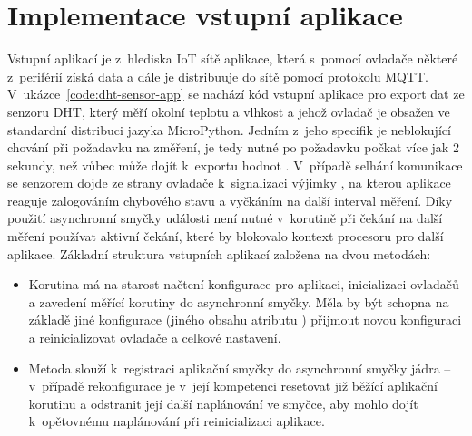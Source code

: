 \section{Implementace vstupní aplikace}\label{sec:implementace-vstupni-aplikace}
Vstupní aplikací je z~hlediska IoT sítě aplikace, která s~pomocí ovladače některé z~periférií získá data a dále je
distribuuje do sítě pomocí protokolu MQTT.
V~ukázce~\ref{code:dht-sensor-app} se nachází kód vstupní aplikace pro export dat ze senzoru DHT, který měří okolní
teplotu a vlhkost a jehož ovladač je obsažen ve standardní distribuci jazyka MicroPython.
Jedním z~jeho specifik je neblokující chování při požadavku na změření, je tedy nutné po požadavku počkat
více jak 2 sekundy, než vůbec může dojít k~exportu hodnot \cite{dht22}.
V~případě selhání komunikace se senzorem dojde ze strany ovladače k~signalizaci výjimky , na kterou aplikace
reaguje zalogováním chybového stavu a vyčkáním na další interval měření.
Díky použití asynchronní smyčky události není nutné v~korutině  při čekání na další měření
používat aktivní čekání, které by blokovalo kontext procesoru pro další aplikace.
Základní struktura vstupních aplikací založena na dvou metodách:
\begin{itemize}
    \item Korutina  má na starost načtení konfigurace pro aplikaci, inicializaci ovladačů a zavedení
    měřící korutiny do asynchronní smyčky. Měla by být schopna na základě jiné konfigurace (jiného obsahu atributu
    ) přijmout novou konfiguraci a reinicializovat ovladače a celkové nastavení.
    \item Metoda  slouží k~registraci aplikační smyčky do asynchronní smyčky jádra -- v~případě
    rekonfigurace je v~její kompetenci resetovat již běžící aplikační korutinu a odstranit její další naplánování ve
    smyčce, aby mohlo dojít k~opětovnému naplánování při reinicializaci aplikace.
\end{itemize}

